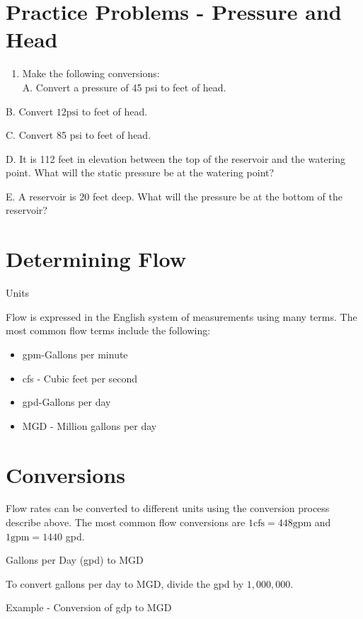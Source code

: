 \section{Practice Problems - Pressure and Head}
\begin{enumerate}
  \item Make the following conversions:\\
A. Convert a pressure of 45 psi to feet of head.
\end{enumerate}
B. Convert $12 \mathrm{psi}$ to feet of head.

C. Convert 85 psi to feet of head.

D. It is 112 feet in elevation between the top of the reservoir and the watering point. What will the static pressure be at the watering point?

E. A reservoir is 20 feet deep. What will the pressure be at the bottom of the reservoir?

\section{Determining Flow}
Units

Flow is expressed in the English system of measurements using many terms. The most common flow terms include the following:

\begin{itemize}
  \item gpm-Gallons per minute

  \item cfs - Cubic feet per second

  \item gpd-Gallons per day

  \item MGD - Million gallons per day

\end{itemize}
\section{Conversions}
Flow rates can be converted to different units using the conversion process describe above. The most common flow conversions are $1 \mathrm{cfs}=448 \mathrm{gpm}$ and $1 \mathrm{gpm}=1440$ gpd.

Gallons per Day (gpd) to MGD

To convert gallons per day to MGD, divide the gpd by $1,000,000$.

Example - Conversion of gdp to MGD

